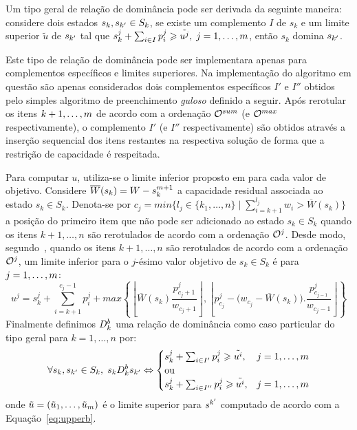 Um tipo geral de relação de dominância pode ser derivada da seguinte maneira:
considere dois estados $s_k, s_{{k'}} \in S_k$, se existe um complemento
$I$ de $s_k$ e um limite superior $\tilde{u}$ de $s_{{k'}}$ tal que
$s_k^j + \sum_{i \in I} p_i^j \geqslant \tilde{u^j},\; j = 1, \ldots, m$,
então $s_k$ domina $s_{{k'}}$.

Este tipo de relação de dominância pode ser implementara apenas para
complementos específicos e limites superiores.
Na implementação do algoritmo em questão são apenas considerados
dois complementos específicos $I'$ e $I''$ obtidos pelo simples algoritmo
de preenchimento \emph{guloso} definido a seguir.
Após rerotular os itens $k+1, \ldots, m$ de acordo com a ordenação
$\mathcal{O}^{sum}$ (e $\mathcal{O}^{max}$ respectivamente), o complemento $I'$
(e $I''$ respectivamente) são obtidos através a inserção sequencial
dos itens restantes na respectiva solução de forma que a restrição
de capacidade é respeitada.

Para computar $u$, utiliza-se o limite inferior proposto em
\cite{martello1990knapsack} para cada valor de objetivo.
Considere $\overline{W}(s_k) = W - s_k^{m+1}$ a capacidade residual associada
ao estado $s_k \in S_k$.
Denota-se por
$c_j = min\big\{l_j \in \{k_1, \ldots, n\} \; | \; \sum_{i=k+1}^{l_j} w_i > \overline{W}(s_k)\big\}$
a posição do primeiro item que não pode ser adicionado ao estado $s_k \in S_k$
quando os itens $k+1, \ldots, n$ são rerotulados de acordo com a ordenação $\mathcal{O}^j$.
Desde modo, segundo~\cite{martello1990knapsack}, quando os itens $k+1, \ldots, n$
são rerotulados de acordo com a ordenação $\mathcal{O}^j$, um limite inferior
para o $j$-ésimo valor objetivo de $s_k \in S_k$ é para $j = 1, \ldots, m$:
\begin{equation}
  u^j = s_k^j + \sum_{i=k+1}^{c_j-1} p_i^j +
    max\left\{ \left\lfloor\overline{W}(s_k)\frac{p^j_{c_j+1}}{w_{c_j+1}} \right\rfloor ,
     \left\lfloor p^j_{c_j} - \big(w_{c_j} - \overline{W}(s_k)\big).\frac{p^j_{c_{j-1}}}{w_{c_j-1}}
     \right\rfloor \right\}
  \label{eq:upperb}
\end{equation}
Finalmente definimos $D_k^{b}$ uma relação de dominância como caso particular
do tipo geral para $k = 1, \ldots, n$ por:
\begin{displaymath}
  \forall s_k, s_{{k'}} \in S_k, \; s_k D_k^{b} s_{{k'}}
    \Leftrightarrow
    \begin{cases}
      s_k^j + \sum_{i \in I'} p_i^j \geqslant \tilde{u^i}, & j = 1, \ldots, m \\
      \text{ou} \\
      s_k^j + \sum_{i \in I''} p_i^j \geqslant \tilde{u^i}, & j = 1, \ldots, m
    \end{cases}
\end{displaymath}
onde $\tilde{u} = (\tilde{u}_1, \ldots, \tilde{u}_m)$ é o limite superior
para $s^{{k'}}$ computado de acordo com a Equação~\ref{eq:upperb}.

